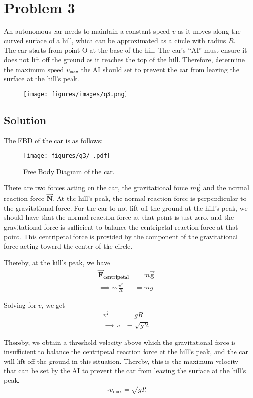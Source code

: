\section*{Problem 3}

An autonomous car needs to maintain a constant speed \( v \) as it moves along the curved surface of a hill, which can be approximated as a circle with radius \( R \).
The car starts from point O at the base of the hill.
The car's ``AI'' must ensure it does not lift off the ground as it reaches the top of the hill.
Therefore, determine the maximum speed \( v_{\max} \) the AI should set to prevent the car from leaving the surface at the hill's peak.

\begin{figure*}[h]
    \centering
    \texttt{[image: figures/images/q3.png]}
\end{figure*}

\subsection*{Solution}

The FBD of the car is as follows:
\begin{figure*}[h]
    \centering
    \texttt{[image: figures/q3/\_.pdf]}
    \caption{
        Free Body Diagram of the car.
    }
\end{figure*}

There are two forces acting on the car, the gravitational force \( m\vec{\mathbf{g}} \) and the normal reaction force \( \vec{\mathbf{N}} \).
At the hill's peak, the normal reaction force is perpendicular to the gravitational force.
For the car to not lift off the ground at the hill's peak, we should have that the normal reaction force at that point is just zero, and the gravitational force is sufficient to balance the centripetal reaction force at that point.
This centripetal force is provided by the component of the gravitational force acting toward the center of the circle.

Thereby, at the hill's peak, we have
\begin{align*}
    \vec{\mathbf{F}}_{\textbf{centripetal}}
     & =
    m\vec{\mathbf{g}}
    \\ \implies
    m\frac{v^2}{R}
     & =
    mg
\end{align*}

Solving for \( v \), we get
\begin{align*}
    v^2 & = gR        \\
    \implies
    v   & = \sqrt{gR}
\end{align*}

Thereby, we obtain a threshold velocity above which the gravitational force is insufficient to balance the centripetal reaction force at the hill's peak, and the car will lift off the ground in this situation.
Thereby, this is the maximum velocity that can be set by the AI to prevent the car from leaving the surface at the hill's peak.
\[
    \therefore \boxed{v_{\max} = \sqrt{gR}}
\]
